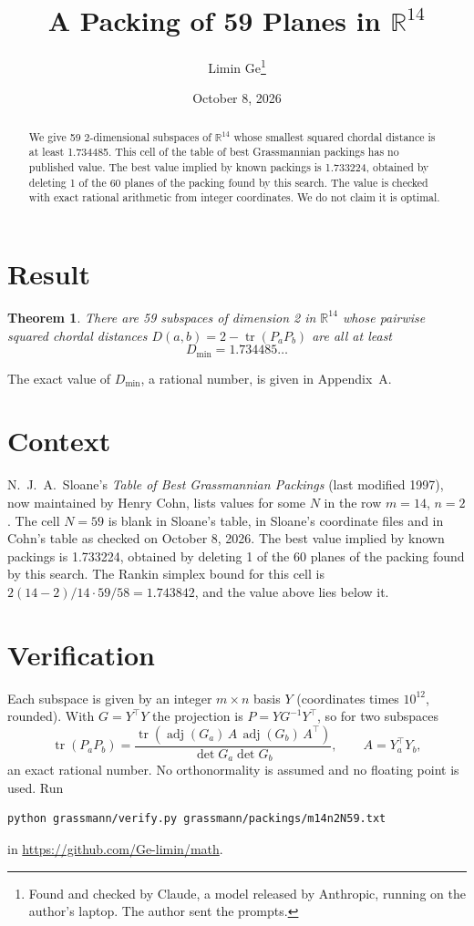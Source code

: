 \documentclass[11pt,a4paper]{article}
\title{A Packing of 59 Planes in $\mathbb{R}^{14}$}
\author{Limin Ge\thanks{Found and checked by Claude, a model released by Anthropic, running on the author's laptop. The author sent the prompts.}}
\date{October 8, 2026}
\newtheorem*{theorem}{Theorem}
\begin{document}
\maketitle
\begin{abstract}
We give 59 2-dimensional subspaces of $\mathbb{R}^{14}$ whose smallest squared chordal distance is at least 1.734485. This cell of the table of best Grassmannian packings has no published value. The best value implied by known packings is 1.733224, obtained by deleting 1 of the 60 planes of the packing found by this search. The value is checked with exact rational arithmetic from integer coordinates. We do not claim it is optimal.
\end{abstract}

\section{Result}
\begin{theorem}
There are 59 subspaces of dimension 2 in $\mathbb{R}^{14}$ whose pairwise squared chordal distances $D(a,b) = 2 - \operatorname{tr}(P_aP_b)$ are all at least
\[ D_{\min} = 1.734485\ldots \]
\end{theorem}
The exact value of $D_{\min}$, a rational number, is given in Appendix~A.


\section{Context}
N.~J.~A.~Sloane's \emph{Table of Best Grassmannian Packings} (last modified 1997), now maintained by Henry Cohn, lists values for some $N$ in the row $m=14$, $n=2$. The cell $N=59$ is blank in Sloane's table, in Sloane's coordinate files and in Cohn's table as checked on October 8, 2026. The best value implied by known packings is 1.733224, obtained by deleting 1 of the 60 planes of the packing found by this search. The Rankin simplex bound for this cell is $2(14-2)/14\cdot 59/58 = 1.743842$, and the value above lies below it.


\section{Verification}
Each subspace is given by an integer $m\times n$ basis $Y$ (coordinates times $10^{12}$, rounded). With $G=Y^\top Y$ the projection is $P=YG^{-1}Y^\top$, so for two subspaces
\[ \operatorname{tr}(P_aP_b)=\frac{\operatorname{tr}(\operatorname{adj}(G_a)\,A\,\operatorname{adj}(G_b)\,A^\top)}{\det G_a\det G_b},\qquad A=Y_a^\top Y_b, \]
an exact rational number. No orthonormality is assumed and no floating point is used. Run
\begin{verbatim}
python grassmann/verify.py grassmann/packings/m14n2N59.txt
\end{verbatim}
in \url{https://github.com/Ge-limin/math}.
\end{document}
